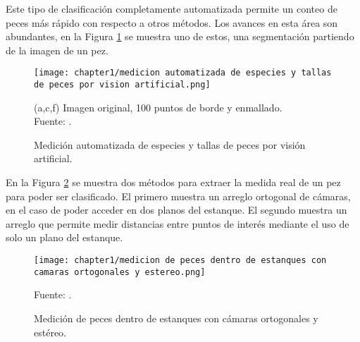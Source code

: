 Este tipo de clasificación completamente automatizada permite un conteo de peces más rápido con respecto a otros métodos.\citep[p.~2-3]{Niu2018} Los avances en esta área son abundantes, en la Figura \ref{fig:medicion automatizada de especies y tallas de peces por vision artificial} se muestra uno de estos, una segmentación partiendo de la imagen de un pez.

\begin{figure}[H]
	\centering
	\texttt{[image: chapter1/medicion automatizada de especies y tallas de peces por vision artificial.png]}
	\caption{Medición automatizada de especies y tallas de peces por visión artificial.}
	\begin{myflushleftportland}
		(a,c,f) Imagen original, 100 puntos de borde y enmallado. \\
		Fuente: \citep[p.~4]{White2006}.
	\end{myflushleftportland}	
	\label{fig:medicion automatizada de especies y tallas de peces por vision artificial}
\end{figure}

En la Figura \ref{fig:medicion de peces dentro de estanques con camaras ortogonales y estereo} se muestra dos métodos para extraer la medida real de un pez para poder ser clasificado. El primero muestra un arreglo ortogonal de cámaras, en el caso de poder acceder en dos planos del estanque. El segundo muestra un arreglo que permite medir distancias entre puntos de interés mediante el uso de solo un plano del estanque.

\begin{figure}[H]
	\centering
	\texttt{[image: chapter1/medicion de peces dentro de estanques con camaras ortogonales y estereo.png]}
	\caption{Medición de  peces dentro de estanques con cámaras ortogonales y estéreo.}
	\begin{myflushleftportland}
		Fuente: \citep{Al-Jubouri2017}.
	\end{myflushleftportland}	
	\label{fig:medicion de peces dentro de estanques con camaras ortogonales y estereo}
\end{figure}



